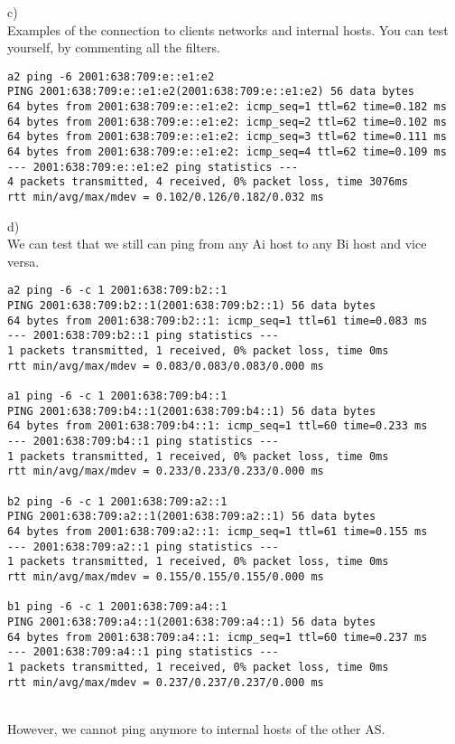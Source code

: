 \documentclass[a4paper]{article}
\begin{document}
c)\\
Examples of the connection to clients networks and internal hosts.
You can test yourself, by commenting all the filters.
\begin{verbatim}
a2 ping -6 2001:638:709:e::e1:e2
PING 2001:638:709:e::e1:e2(2001:638:709:e::e1:e2) 56 data bytes
64 bytes from 2001:638:709:e::e1:e2: icmp_seq=1 ttl=62 time=0.182 ms
64 bytes from 2001:638:709:e::e1:e2: icmp_seq=2 ttl=62 time=0.102 ms
64 bytes from 2001:638:709:e::e1:e2: icmp_seq=3 ttl=62 time=0.111 ms
64 bytes from 2001:638:709:e::e1:e2: icmp_seq=4 ttl=62 time=0.109 ms
--- 2001:638:709:e::e1:e2 ping statistics ---
4 packets transmitted, 4 received, 0% packet loss, time 3076ms
rtt min/avg/max/mdev = 0.102/0.126/0.182/0.032 ms
\end{verbatim}
d)\\
We can test that we still can ping from any Ai host to any Bi host and vice versa.
\begin{verbatim}
a2 ping -6 -c 1 2001:638:709:b2::1
PING 2001:638:709:b2::1(2001:638:709:b2::1) 56 data bytes
64 bytes from 2001:638:709:b2::1: icmp_seq=1 ttl=61 time=0.083 ms
--- 2001:638:709:b2::1 ping statistics ---
1 packets transmitted, 1 received, 0% packet loss, time 0ms
rtt min/avg/max/mdev = 0.083/0.083/0.083/0.000 ms

a1 ping -6 -c 1 2001:638:709:b4::1
PING 2001:638:709:b4::1(2001:638:709:b4::1) 56 data bytes
64 bytes from 2001:638:709:b4::1: icmp_seq=1 ttl=60 time=0.233 ms
--- 2001:638:709:b4::1 ping statistics ---
1 packets transmitted, 1 received, 0% packet loss, time 0ms
rtt min/avg/max/mdev = 0.233/0.233/0.233/0.000 ms

b2 ping -6 -c 1 2001:638:709:a2::1
PING 2001:638:709:a2::1(2001:638:709:a2::1) 56 data bytes
64 bytes from 2001:638:709:a2::1: icmp_seq=1 ttl=61 time=0.155 ms
--- 2001:638:709:a2::1 ping statistics ---
1 packets transmitted, 1 received, 0% packet loss, time 0ms
rtt min/avg/max/mdev = 0.155/0.155/0.155/0.000 ms

b1 ping -6 -c 1 2001:638:709:a4::1
PING 2001:638:709:a4::1(2001:638:709:a4::1) 56 data bytes
64 bytes from 2001:638:709:a4::1: icmp_seq=1 ttl=60 time=0.237 ms
--- 2001:638:709:a4::1 ping statistics ---
1 packets transmitted, 1 received, 0% packet loss, time 0ms
rtt min/avg/max/mdev = 0.237/0.237/0.237/0.000 ms
\end{verbatim}\\
However, we cannot ping anymore to internal hosts of the other AS.\\
\\
\end{document}
